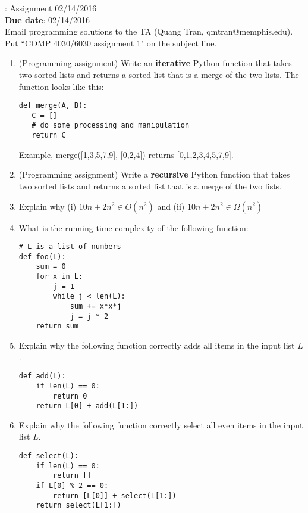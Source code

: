 \documentclass[11pt, oneside]{article}    %
\newcommand{\hw}[2]{\noindent {\bf COMP 4030/6030}: Assignment #2\\
{\bf Due date}: #2\\}
\begin{document}
\hw{1}{02/14/2016}

Email programming solutions to the TA (Quang Tran, qmtran@memphis.edu).  Put ``COMP 4030/6030 assignment 1" on the subject line.
\begin{enumerate}
	\item (Programming assignment) Write an {\bf iterative} Python function that takes two sorted lists and returns a sorted list that is a merge of the two lists.  The function looks like this:
\begin{verbatim}
def merge(A, B):
   C = []
   # do some processing and manipulation
   return C
\end{verbatim}
Example, merge([1,3,5,7,9], [0,2,4]) returns [0,1,2,3,4,5,7,9]. 

	\item (Programming assignment) Write a {\bf recursive} Python function that takes two sorted lists and returns a sorted list that is a merge of the two lists.
	
	\item Explain why (i) $10n + 2n^2 \in O(n^2)$ and (ii) $10n + 2n^2 \in \Omega(n^2)$
	\item What is the running time complexity of the following function:

\begin{verbatim}
# L is a list of numbers
def foo(L):
    sum = 0
    for x in L:
        j = 1
        while j < len(L):
            sum += x*x*j
            j = j * 2
    return sum
\end{verbatim}

	\item Explain why the following function correctly adds all items in the input list $L$.
\begin{verbatim}
def add(L):
    if len(L) == 0:
        return 0
    return L[0] + add(L[1:])
\end{verbatim}

	\item Explain why the following function correctly select all even items in the input list $L$.
\begin{verbatim}
def select(L):
    if len(L) == 0:
        return []
    if L[0] % 2 == 0:
        return [L[0]] + select(L[1:])
    return select(L[1:])
\end{verbatim}

\end{enumerate}
\end{document}
